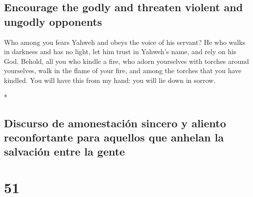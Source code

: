 \begin{paracol}{2}
\begin{otherlanguage}{english}
{\subsection{Encourage the godly and threaten violent and ungodly
opponents}\label{encourage-the-godly-and-threaten-violent-and-ungodly-opponents}}

 Who among you fears Yahweh and obeys the voice of his
servant? He who walks in darkness and has no light, let him trust in
Yahweh's name, and rely on his God.  Behold, all you who
kindle a fire, who adorn yourselves with torches around yourselves, walk
in the flame of your fire, and among the torches that you have kindled.
You will have this from my hand: you will lie down in sorrow.

\end{otherlanguage}

\switchcolumn[0]*

\hypertarget{discurso-de-amonestaciuxf3n-sincero-y-aliento-reconfortante-para-aquellos-que-anhelan-la-salvaciuxf3n-entre-la-gente}{%
\subsection{Discurso de amonestación sincero y aliento reconfortante
para aquellos que anhelan la salvación entre la
gente}\label{discurso-de-amonestaciuxf3n-sincero-y-aliento-reconfortante-para-aquellos-que-anhelan-la-salvaciuxf3n-entre-la-gente}}

\hypertarget{section-100}{%
\section{51}\label{section-100}}


\end{paracol}
